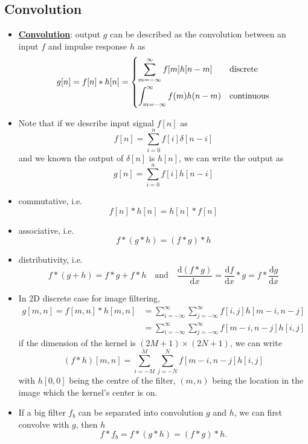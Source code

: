 \documentclass[twocolumn,landscape,10pt]{article}
\theoremstyle{definition}
\begin{document}
\subsection{Convolution}

\begin{itemize}
    \item \underline{\textbf{Convolution}}: output $g$ can be described as the
        convolution between an input $f$ and impulse response $h$ as
        \[
            g[n]=f[n]*h[n]=
            \begin{dcases}
                \sum_{m=-\infty}^{\infty} f[m]h[n-m] & \text{discrete} \\
                \int_{m=-\infty}^{\infty} f(m)h(n-m) & \text{continuous} \\
            \end{dcases} 
        \]
    \item Note that if we describe input signal $f[n]$ as
        \[
            f[n]=\sum_{i=0}^{n} f[i]\delta[n-i]
        \]
        and we known the output of $\delta[n]$ is $h[n]$, we can write the
        output as
        \[
            g[n]=\sum_{i=0}^{n} f[i]h[n-i]
        \]
    \item commutative, i.e.\ 
        \[
            f[n]*h[n] = h[n]*f[n]
        \]
    \item associative, i.e.\
        \[
            f*(g*h)=(f*g)*h
        \]
    \item distributivity, i.e.\
        \[
            f*(g+h)=f*g+f*h
            \quad\text{and}\quad
            \frac{\mathrm{d}(f*g)}{\mathrm{d}x}=\frac{\mathrm{d}f}{\mathrm{d}x}*g=f*\frac{\mathrm{d}g}{\mathrm{d}x}
        \]
    \item In 2D discrete case for image filtering,
        \begin{align*}
            g[m,n]=f[m,n]*h[m,n]
            & =\sum_{i=-\infty}^{\infty}\sum_{j=-\infty}^{\infty}
            f[i,j]h[m-i,n-j] \\
            & =\sum_{i=-\infty}^{\infty}\sum_{j=-\infty}^{\infty}
            f[m-i,n-j]h[i,j]
        \end{align*} 
        if the dimension of the kernel is $(2M+1)\times(2N+1)$, we can write
        \[
            (f*h)[m,n]=\sum_{i=-M}^{M} \sum_{j=-N}^{N}
            f[m-i,n-j]h[i,j]
        \]
        with $h[0,0]$ being the centre of the filter, $(m,n)$ being the
        location in the image which the kernel's center is on.
    \item If a big filter $f_b$ can be separated into convolution $g$
        and $h$, we can first convolve with $g$, then $h$
        \[
            f*f_b=f*(g*h)=(f*g)*h.
        \]
\end{itemize} 
\end{document}
